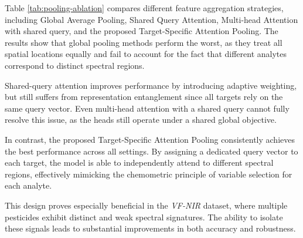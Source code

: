 \documentclass[pdflatex,sn-mathphys-num]{sn-jnl}%
\begin{document}
Table \ref{tab:pooling-ablation} compares different feature aggregation strategies, including Global Average Pooling, Shared Query Attention, Multi-head Attention with shared query, and the proposed Target-Specific Attention Pooling. The results show that global pooling methods perform the worst, as they treat all spatial locations equally and fail to account for the fact that different analytes correspond to distinct spectral regions.

Shared-query attention improves performance by introducing adaptive weighting, but still suffers from representation entanglement since all targets rely on the same query vector. Even multi-head attention with a shared query cannot fully resolve this issue, as the heads still operate under a shared global objective.

In contrast, the proposed Target-Specific Attention Pooling consistently achieves the best performance across all settings. By assigning a dedicated query vector to each target, the model is able to independently attend to different spectral regions, effectively mimicking the chemometric principle of variable selection for each analyte.

This design proves especially beneficial in the \textit{VF-NIR} dataset, where multiple pesticides exhibit distinct and weak spectral signatures. The ability to isolate these signals leads to substantial improvements in both accuracy and robustness.
\end{document}
